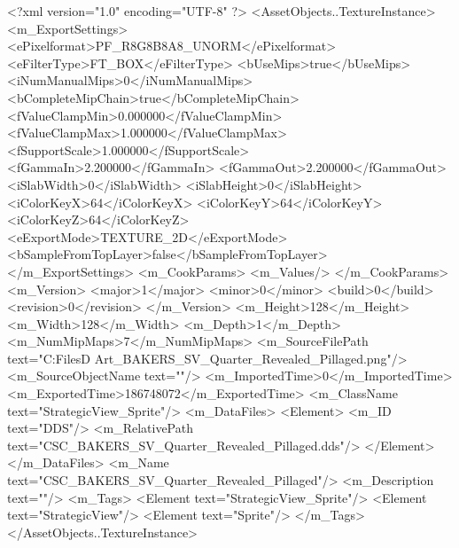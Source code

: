 <?xml version="1.0" encoding="UTF-8" ?>
<AssetObjects..TextureInstance>
	<m_ExportSettings>
		<ePixelformat>PF_R8G8B8A8_UNORM</ePixelformat>
		<eFilterType>FT_BOX</eFilterType>
		<bUseMips>true</bUseMips>
		<iNumManualMips>0</iNumManualMips>
		<bCompleteMipChain>true</bCompleteMipChain>
		<fValueClampMin>0.000000</fValueClampMin>
		<fValueClampMax>1.000000</fValueClampMax>
		<fSupportScale>1.000000</fSupportScale>
		<fGammaIn>2.200000</fGammaIn>
		<fGammaOut>2.200000</fGammaOut>
		<iSlabWidth>0</iSlabWidth>
		<iSlabHeight>0</iSlabHeight>
		<iColorKeyX>64</iColorKeyX>
		<iColorKeyY>64</iColorKeyY>
		<iColorKeyZ>64</iColorKeyZ>
		<eExportMode>TEXTURE_2D</eExportMode>
		<bSampleFromTopLayer>false</bSampleFromTopLayer>
	</m_ExportSettings>
	<m_CookParams>
		<m_Values/>
	</m_CookParams>
	<m_Version>
		<major>1</major>
		<minor>0</minor>
		<build>0</build>
		<revision>0</revision>
	</m_Version>
	<m_Height>128</m_Height>
	<m_Width>128</m_Width>
	<m_Depth>1</m_Depth>
	<m_NumMipMaps>7</m_NumMipMaps>
	<m_SourceFilePath text="C:\Users\Shadow\Desktop\Working Files\2D Art\Quarters\Bakers\StrategicView\CSC_BAKERS_SV_Quarter_Revealed_Pillaged.png"/>
	<m_SourceObjectName text=""/>
	<m_ImportedTime>0</m_ImportedTime>
	<m_ExportedTime>186748072</m_ExportedTime>
	<m_ClassName text="StrategicView_Sprite"/>
	<m_DataFiles>
		<Element>
			<m_ID text="DDS"/>
			<m_RelativePath text="CSC_BAKERS_SV_Quarter_Revealed_Pillaged.dds"/>
		</Element>
	</m_DataFiles>
	<m_Name text="CSC_BAKERS_SV_Quarter_Revealed_Pillaged"/>
	<m_Description text=""/>
	<m_Tags>
		<Element text="StrategicView_Sprite"/>
		<Element text="StrategicView"/>
		<Element text="Sprite"/>
	</m_Tags>
</AssetObjects..TextureInstance>

